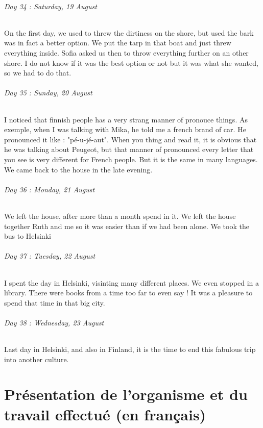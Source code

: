 \documentclass[a4paper,12pt]{report} %
\begin{document}
\paragraph{Day 34 : Saturday, 19 August}
\subparagraph{On the first day, we used to threw the dirtiness on the shore, but used the bark was in fact a better option. We put the tarp in that boat and just threw everything inside. Sofia asked us then to throw everything further on an other shore. I do not know if it was the best option or not but it was what she wanted, so we had to do that.}

\paragraph{Day 35 : Sunday, 20 August}
\subparagraph{I noticed that finnish people has a very strang manner of pronouce things. As exemple, when I was talking with Mika, he told me a french brand of car. He pronounced it like : "pé-u-jé-aut". When you thing and read it, it is obvious that he was talking about Peugeot, but that manner of pronounced every letter that you see is very different for French people. But it is the same in many languages. We came back to the house in the late evening.}

\paragraph{Day 36 : Monday, 21 August}
\subparagraph{We left the house, after more than a month spend in it. We left the house together Ruth and me so it was easier than if we had been alone. We took the bus to Helsinki }

\paragraph{Day 37 : Tuesday, 22 August}
\subparagraph{I spent the day in Helsinki, visinting many different places. We even stopped in a library. There were books from a time too far to even say ! It was a pleasure to spend that time in that big city.}

\paragraph{Day 38 : Wednesday, 23 August}
\subparagraph{Last day in Helsinki, and also in Finland, it is the time to end this fabulous trip into another culture.}

\newpage
\part{Présentation de l’organisme et du travail effectué (en français)}%
\label{pt:2}
\end{document}
